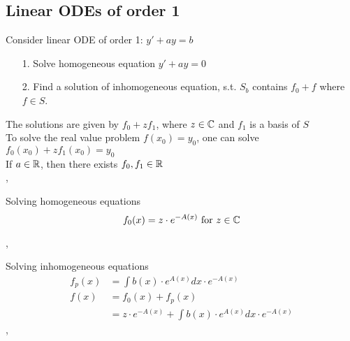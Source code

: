 \subsection{Linear ODEs of order 1}
\Def Consider linear ODE of order 1: $y' + ay = b $
\begin{enumerate}
\item[1.] Solve homogeneous equation $y' + ay = 0$ 
\item[2.] Find a solution of inhomogeneous equation, s.t. $S_b$ contains $f_0 + f$ where $f \in S$.
\end{enumerate}
\Bem The solutions are given by $f_0 + z f_1$, where $z \in \mathbb{C}$ and $f_1$ is a basis of $S$ \\
\Bem To solve the real value problem $f(x_0) = y_0$, one can solve $f_0(x_0) + z f_1(x_0) = y_0$ \\
\Bem If $a \in \mathbb{R}$, then there exists $f_0, f_1 \in \mathbb{R}$ \\

\sep

\Procedure Solving homogeneous equations
\[ f_0(x) = z \cdot e^{-A(x)} \text{ for } z \in \mathbb{C}\]

\sep

\Procedure Solving inhomogeneous equations
\begin{align*}
f_p(x) &= \int b(x) \cdot e^{A(x)} dx \cdot e^{-A(x)} \\
f(x) &= f_0(x) + f_p(x) \\
&= z \cdot e^{-A(x)} + \int b(x) \cdot e^{A(x)} dx \cdot e^{-A(x)}
\end{align*}
\sep

